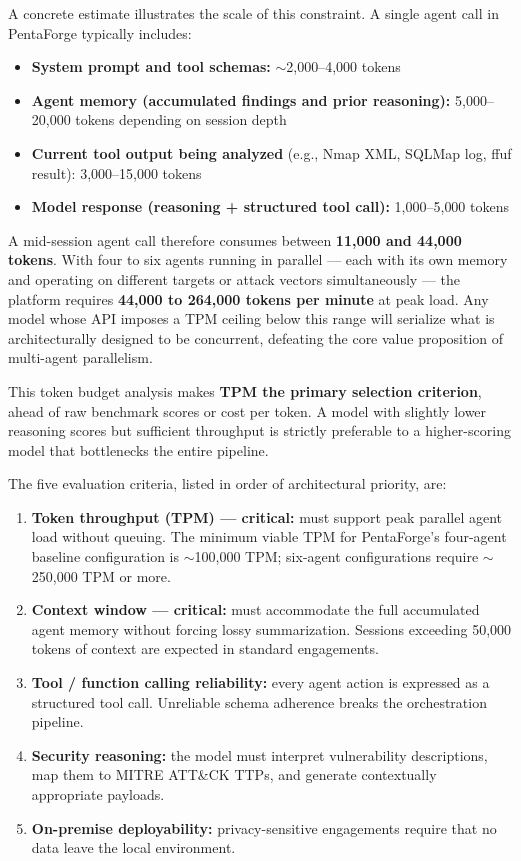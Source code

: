\documentclass[12pt,a4paper]{report}
\begin{document}
A concrete estimate illustrates the scale of this constraint. A single agent call
in PentaForge typically includes:

\begin{itemize}
    \item \textbf{System prompt and tool schemas:} $\sim$2{,}000--4{,}000 tokens
    \item \textbf{Agent memory (accumulated findings and prior reasoning):} 5{,}000--20{,}000 tokens depending on session depth
    \item \textbf{Current tool output being analyzed} (e.g., Nmap XML, SQLMap log, ffuf result): 3{,}000--15{,}000 tokens
    \item \textbf{Model response (reasoning + structured tool call):} 1{,}000--5{,}000 tokens
\end{itemize}

A mid-session agent call therefore consumes between \textbf{11{,}000 and 44{,}000 tokens}.
With four to six agents running in parallel --- each with its own memory and operating
on different targets or attack vectors simultaneously --- the platform requires
\textbf{44{,}000 to 264{,}000 tokens per minute} at peak load. Any model whose API
imposes a TPM ceiling below this range will serialize what is architecturally
designed to be concurrent, defeating the core value proposition of multi-agent
parallelism.

This token budget analysis makes \textbf{TPM the primary selection criterion},
ahead of raw benchmark scores or cost per token. A model with slightly lower
reasoning scores but sufficient throughput is strictly preferable to a higher-scoring
model that bottlenecks the entire pipeline.

The five evaluation criteria, listed in order of architectural priority, are:

\begin{enumerate}
    \item \textbf{Token throughput (TPM) --- critical:} must support peak parallel
    agent load without queuing. The minimum viable TPM for PentaForge's four-agent
    baseline configuration is $\sim$100{,}000 TPM; six-agent configurations require
    $\sim$250{,}000 TPM or more.
    \item \textbf{Context window --- critical:} must accommodate the full accumulated
    agent memory without forcing lossy summarization. Sessions exceeding 50{,}000
    tokens of context are expected in standard engagements.
    \item \textbf{Tool / function calling reliability:} every agent action is
    expressed as a structured tool call. Unreliable schema adherence breaks the
    orchestration pipeline.
    \item \textbf{Security reasoning:} the model must interpret vulnerability
    descriptions, map them to MITRE ATT\&CK TTPs, and generate contextually
    appropriate payloads.
    \item \textbf{On-premise deployability:} privacy-sensitive engagements require
    that no data leave the local environment.
\end{enumerate}
\end{document}
